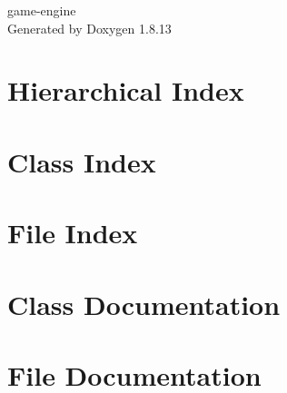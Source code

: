 \documentclass[twoside]{book}
\newcommand{\+}{\discretionary{\mbox{\scriptsize$\hookleftarrow$}}{}{}}
\newcommand{\clearemptydoublepage}{%
  \newpage{\pagestyle{empty}\cleardoublepage}%
}
\begin{document}
\hypersetup{pageanchor=false,
             bookmarksnumbered=true,
             pdfencoding=unicode
            }
\begin{titlepage}
\vspace*{7cm}
\begin{center}%
{\Large game-\/engine }\\
\vspace*{1cm}
{\large Generated by Doxygen 1.8.13}\\
\end{center}
\end{titlepage}
\clearemptydoublepage
{}
\tableofcontents
\clearemptydoublepage
{}
\hypersetup{pageanchor=true}

\chapter{Hierarchical Index}

\chapter{Class Index}

\chapter{File Index}

\chapter{Class Documentation}


































\chapter{File Documentation}


\backmatter
\newpage
{}
\clearemptydoublepage
{}
\printindex
\end{document}
